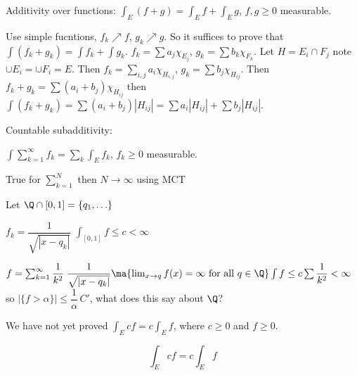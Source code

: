 Additivity over functions: $\int_E (f+g)= \int_E f + \int_E g$, $f,g \geq 0$ measurable. 

\pf Use simple fucntions, $f_k \nearrow f$, $g_k \nearrow g$. So it suffices to prove that $\int (f_k+g_k)= \int f_k + \int g_k$. $f_k= \sum a_j \chi_{E_j}$, $g_k = \sum b_k \chi_{F_k}$. Let $H= E_i \cap F_j$ note $\cup E_i= \cup F_i = E$. Then $f_k= \sum_{i,j} a_i \chi_{H_{i,j}}$, $g_k= \sum b_j \chi_{H_{ij}}$. Then $f_k+g_k= \sum (a_i+b_j) \chi_{H_{ij}}$ then $\int (f_k+g_k) = \sum (a_i+b_j) |H_{ij}|= \sum a_i |H_{ij}| + \sum b_j |H_{ij}|$. 

Countable subadditivity:

$\int \sum_{k=1}^\infty f_k = \sum_k \int_E f_k$, $f_k \geq 0$ measurable.

True for $\sum_{k=1}^N$ then $N \to \infty$ using MCT


\begin{ex}
Let $\Q \cap [0,1]= \{q_1,\ldots\}$

$f_k= \dfrac{1}{\sqrt{|x-q_k|}}$ $\int_{[0,1]} f \leq c < \infty$

$f= \sum_{k=1}^\infty \dfrac{1}{k^2} \; \dfrac{1}{\sqrt{|x-q_k|}} \ma{\lim_{x \to q} f(x)=\infty \text{ for all } q \in \Q} \int f \leq c \sum \dfrac{1}{k^2}< \infty$ so $|\{f>\alpha\}| \leq \dfrac{1}{\alpha}\, C'$, what does this say about $\Q$?
\end{ex}


















We have not yet proved $\int_E cf = c \int_E f$, where $c \geq 0$ and $f \geq 0$.

\begin{prop}
\[ \int_E cf = c \int_E f \]
\end{prop}

